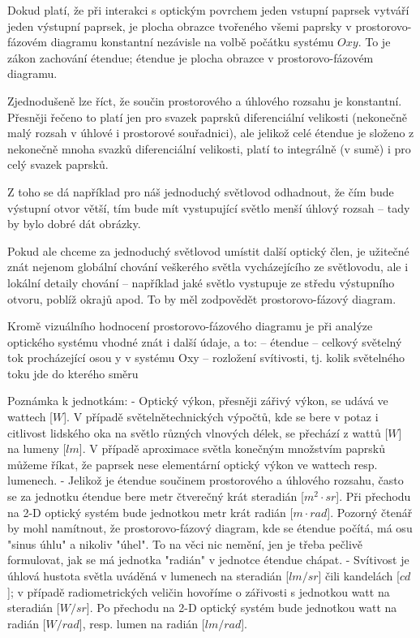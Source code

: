 Dokud platí, že při interakci s optickým povrchem jeden vstupní paprsek
vytváří jeden výstupní paprsek, je plocha obrazce tvořeného všemi
paprsky v prostorovo-fázovém diagramu konstantní nezávisle na volbě
počátku systému $Oxy$. To je zákon zachování étendue; étendue
je plocha obrazce v prostorovo-fázovém diagramu.

Zjednodušeně lze říct, že součin prostorového a úhlového rozsahu je
konstantní. Přesněji řečeno to platí jen pro svazek paprsků
diferenciální velikosti (nekonečně malý rozsah v úhlové i prostorové
souřadnici), ale jelikož celé étendue je složeno z nekonečně mnoha
svazků diferenciální velikosti, platí to integrálně (v sumě) i pro celý
svazek paprsků.


Z toho se dá například pro náš jednoduchý světlovod odhadnout, že čím
bude výstupní otvor větší, tím bude mít vystupující světlo menší úhlový
rozsah -- tady by bylo dobré dát obrázky.

Pokud ale chceme za jednoduchý světlovod umístit další optický člen, je
užitečné znát nejenom globální chování veškerého světla vycházejícího ze
světlovodu, ale i lokální detaily chování -- například jaké světlo
vystupuje ze středu výstupního otvoru, poblíž okrajů apod. To by měl
zodpovědět prostorovo-fázový diagram.

Kromě vizuálního hodnocení prostorovo-fázového diagramu je při analýze
optického systému vhodné znát i další údaje, a to:
-- étendue
-- celkový světelný tok procházející osou y v systému Oxy
-- rozložení svítivosti, tj. kolik světelného toku jde do kterého směru

Poznámka k jednotkám:
- Optický výkon, přesněji zářivý výkon, se udává ve wattech [$W$]. V
případě světelnětechnických výpočtů, kde se bere v potaz i citlivost
lidského oka na světlo různých vlnových délek, se přechází z wattů [$W$]
na lumeny [$lm$]. V případě aproximace světla konečným množstvím paprsků
můžeme říkat, že paprsek nese elementární optický výkon ve wattech resp.
lumenech.
- Jelikož je étendue součinem prostorového a úhlového rozsahu, často se
za jednotku étendue bere metr čtverečný krát steradián [$m^2 \cdot sr$]. Při
přechodu na 2-D optický systém bude jednotkou metr krát radián [$m \cdot rad$].
Pozorný čtenář by mohl namítnout, že prostorovo-fázový diagram,
kde se étendue počítá, má osu "sinus úhlu" a nikoliv "úhel". To na věci
nic nemění, jen je třeba pečlivě formulovat, jak se má jednotka "radián"
v jednotce étendue chápat.
- Svítivost je úhlová hustota světla uváděná v lumenech na steradián
[$lm/sr$] čili kandelách [$cd$]; v případě radiometrických veličin hovoříme
o zářivosti s jednotkou watt na steradián [$W/sr$]. Po přechodu na 2-D
optický systém bude jednotkou watt na radián [$W/rad$], resp. lumen na
radián [$lm/rad$].


